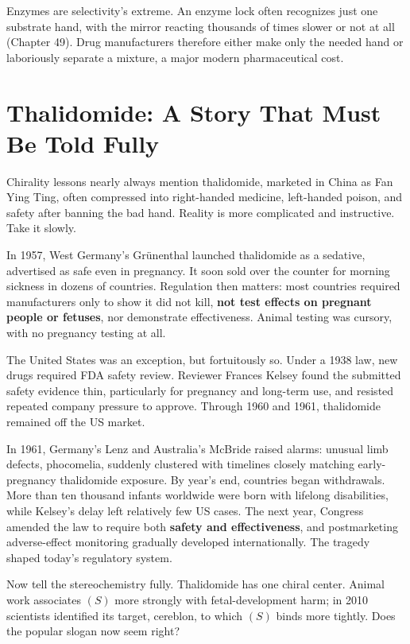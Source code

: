 Enzymes are selectivity's extreme. An enzyme lock often recognizes just one substrate hand, with the mirror reacting thousands of times slower or not at all (Chapter 49). Drug manufacturers therefore either make only the needed hand or laboriously separate a mixture, a major modern pharmaceutical cost.

\section{Thalidomide: A Story That Must Be Told Fully}

Chirality lessons nearly always mention thalidomide, marketed in China as Fan Ying Ting, often compressed into right-handed medicine, left-handed poison, and safety after banning the bad hand. Reality is more complicated and instructive. Take it slowly.

In 1957, West Germany's Grünenthal launched thalidomide as a sedative, advertised as safe even in pregnancy. It soon sold over the counter for morning sickness in dozens of countries. Regulation then matters: most countries required manufacturers only to show it did not kill, \textbf{not test effects on pregnant people or fetuses}, nor demonstrate effectiveness. Animal testing was cursory, with no pregnancy testing at all.

The United States was an exception, but fortuitously so. Under a 1938 law, new drugs required FDA safety review. Reviewer Frances Kelsey found the submitted safety evidence thin, particularly for pregnancy and long-term use, and resisted repeated company pressure to approve. Through 1960 and 1961, thalidomide remained off the US market.

In 1961, Germany's Lenz and Australia's McBride raised alarms: unusual limb defects, phocomelia, suddenly clustered with timelines closely matching early-pregnancy thalidomide exposure. By year's end, countries began withdrawals. More than ten thousand infants worldwide were born with lifelong disabilities, while Kelsey's delay left relatively few US cases. The next year, Congress amended the law to require both \textbf{safety and effectiveness}, and postmarketing adverse-effect monitoring gradually developed internationally. The tragedy shaped today's regulatory system.

Now tell the stereochemistry fully. Thalidomide has one chiral center. Animal work associates $(S)$ more strongly with fetal-development harm; in 2010 scientists identified its target, cereblon, to which $(S)$ binds more tightly. Does the popular slogan now seem right?

